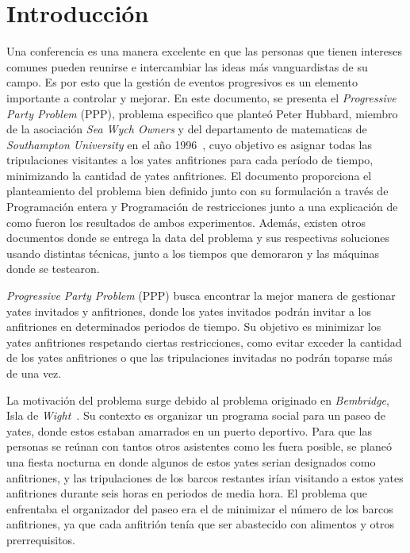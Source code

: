 \documentclass[letter, 10pt]{article}
\begin{document}
\section{Introducción}
Una conferencia es una manera excelente en que las personas que tienen intereses comunes pueden reunirse e intercambiar las ideas m\'as vanguardistas de su campo. Es por esto que la gestión de eventos progresivos es un elemento importante a controlar y mejorar. En este documento, se presenta el \textit{Progressive Party Problem} (PPP), problema especifico que plante\'o Peter Hubbard, miembro de la asociación \textit{Sea Wych Owners} y del departamento de matematicas de \textit{Southampton University} en el a\~no 1996~\cite{Kalvelagen20031713}, cuyo objetivo es asignar todas las tripulaciones visitantes a los yates anfitriones para cada período de tiempo, minimizando la cantidad de yates anfitriones. El documento proporciona el planteamiento del problema bien definido junto con su formulación a través de Programación entera y Programación de restricciones junto a una explicación de como fueron los resultados de ambos experimentos. Además, existen otros documentos donde se entrega la data del problema y sus respectivas soluciones usando distintas técnicas, junto a los tiempos que demoraron y las máquinas donde se testearon.

\textit{Progressive Party Problem} (PPP) busca encontrar la mejor manera de gestionar yates invitados y anfitriones, donde los yates invitados podrán invitar a los anfitriones en determinados periodos de tiempo. Su objetivo es minimizar los yates anfitriones respetando ciertas restricciones, como evitar exceder la cantidad de los yates anfitriones o que las tripulaciones invitadas no podrán toparse más de una vez.

La motivación del problema surge debido al problema originado en \textit{Bembridge}, Isla de \textit{Wight}~\cite{Kalvelagen20031713}. Su contexto es organizar un programa social para un paseo de yates, donde estos estaban amarrados en un puerto deportivo. Para que las personas se reúnan con tantos otros asistentes como les fuera posible, se planeó una fiesta nocturna en donde algunos de estos yates serian designados como anfitriones, y las tripulaciones de los barcos restantes irían visitando a estos yates anfitriones durante seis horas en periodos de media hora. El problema que enfrentaba el organizador del paseo era el de minimizar el número de los barcos anfitriones, ya que cada anfitrión tenía que ser abastecido con alimentos y otros prerrequisitos. 
\end{document}
